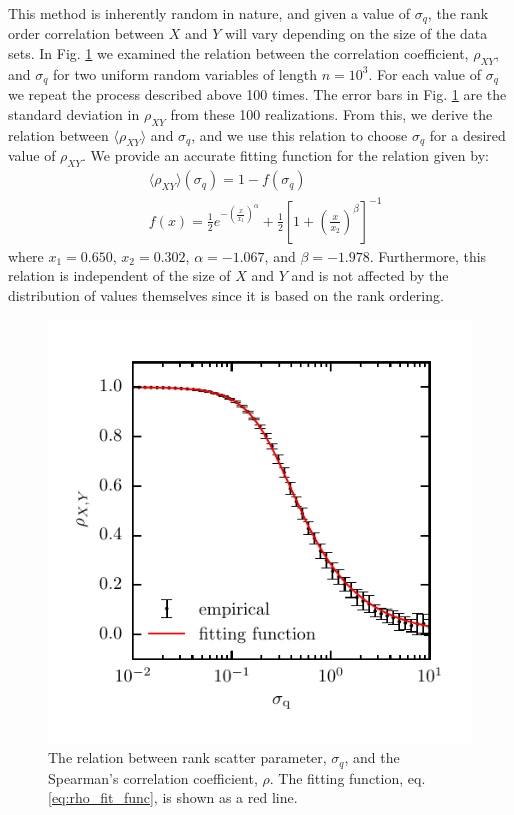 \documentclass[useAMS,fleqn,usenatbib]{mnras}
\begin{document}
This method is inherently random in nature, and given a value of $\sigma_q$, the rank order correlation between $X$ and $Y$ will vary depending on the size of the data sets.  In Fig. \ref{fig:rho_sigma} we examined the relation between the correlation coefficient, $\rho_{XY}$, and $\sigma_q$ for two uniform random variables of length $n=10^{3}$.  For each value of $\sigma_q$ we repeat the process described above 100 times.  The error bars in Fig. \ref{fig:rho_sigma} are the standard deviation in $\rho_{XY}$ from these 100 realizations.  From this, we derive the relation between $\langle \rho_{XY} \rangle$ and $\sigma_q$, and we use this relation to choose $\sigma_q$ for a desired value of $\rho_{XY}$.  We provide an accurate fitting function for the relation given by:
%
\begin{align}
\label{eq:rho_fit_func}
&\langle \rho_{XY} \rangle(\sigma_q) = 1-f(\sigma_q) \\
&f(x) = \frac{1}{2}e^{-\left(\frac{x}{x_1}\right)^{\alpha}} + \frac{1}{2} \left[1+ \left( \frac{x}{x_2} \right)^{\beta} \right]^{-1} \nonumber
\end{align}
% 
where $x_1=0.650$, $x_2=0.302$, $\alpha=-1.067$, and $\beta=-1.978$.  Furthermore, this relation is independent of the size of $X$ and $Y$ and is not affected by the distribution of values themselves since it is based on the rank ordering.

%
\begin{figure}
\includegraphics[width=\columnwidth]{figures/rho_sigma.pdf}
\caption{The relation between rank scatter parameter, $\sigma_q$, and the Spearman's correlation coefficient, $\rho$.  The fitting function, eq. \ref{eq:rho_fit_func}, is shown as a red line.}
\label{fig:rho_sigma}
\end{figure}
%

\bsp	%
\label{lastpage}
\end{document}
